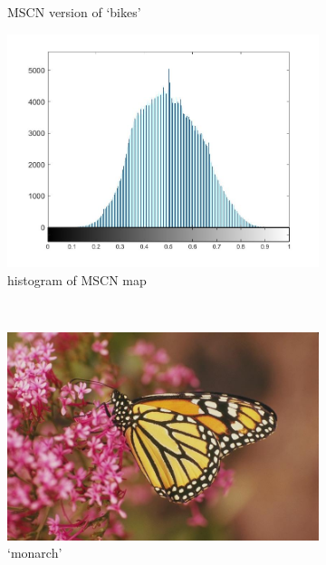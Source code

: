 \begin{figure}
\begin{subfigure}[b]{0.3\textwidth}
         \caption{MSCN version of `bikes'}
         \label{fig:mscnhst_mscn_bikes}
     \end{subfigure}
     \hfill
     \begin{subfigure}[b]{0.3\textwidth}
         \centering
         \includegraphics[width=\textwidth]{./figs/mscn_histreference}
         \caption{histogram of MSCN map}
         \label{fig:mscnhst_hst_bikes}
     \end{subfigure}
     \\
     \begin{subfigure}[b]{0.3\textwidth}
         \centering
         \includegraphics[width=\textwidth]{./figs/monarch}
         \caption{`monarch'}
         \label{fig:mscnhst_monarch}
     \end{subfigure}
     \hfill
     \begin{subfigure}[b]{0.3\textwidth}

\end{subfigure}
\end{figure}
